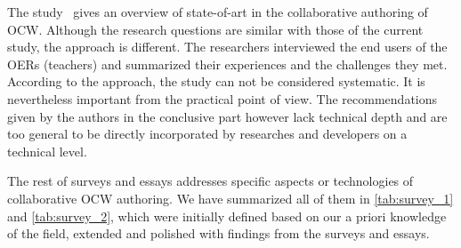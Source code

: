 \documentclass[ngerman,UKenglish,table]{scrbook}
\begin{document}
The study~\cite{Luo2010} gives an overview of state-of-art in the collaborative authoring of OCW.
Although the research questions are similar with those of the current study, the approach is different.
The researchers interviewed the end users of the OERs (teachers) and summarized their experiences and the challenges they met.
According to the approach, the study can not be considered systematic.
It is nevertheless important from the practical point of view.
The recommendations given by the authors in the conclusive part however lack technical depth and are too general to be directly incorporated by researches and developers on a technical level.


The rest of surveys and essays addresses specific aspects or technologies of collaborative OCW authoring.
We have summarized all of them in \autoref{tab:survey_1} and \autoref{tab:survey_2}, which were initially defined based on our a priori knowledge of the field, extended and polished with findings from the surveys and essays.
\end{document}
